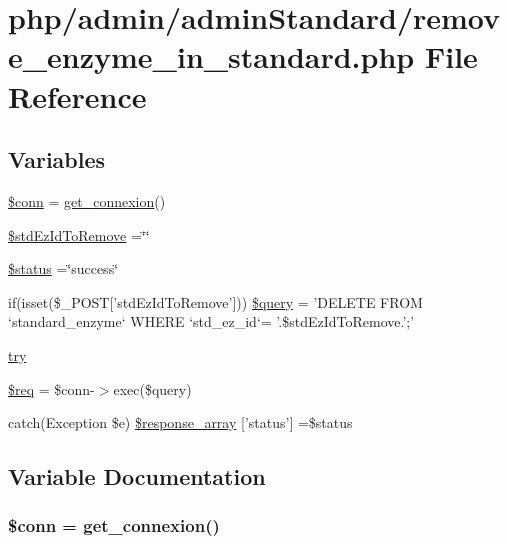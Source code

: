 \hypertarget{remove__enzyme__in__standard_8php}{\section{php/admin/admin\-Standard/remove\-\_\-enzyme\-\_\-in\-\_\-standard.php File Reference}
\label{remove__enzyme__in__standard_8php}
}
\subsection*{Variables}
\begin{DoxyCompactItemize}
\item 
\hyperlink{remove__enzyme__in__standard_8php_aa8a5a87b9c1a6a0819b88447cbe41877}{\$conn} = \hyperlink{php__functions_8php_ace18bc10f3fd08f92688ac743e0d8c2e}{get\-\_\-connexion}()
\item 
\hyperlink{remove__enzyme__in__standard_8php_a82f60c379683413d3b4269adbe259606}{\$std\-Ez\-Id\-To\-Remove} =\char`\"{}\char`\"{}
\item 
\hyperlink{remove__enzyme__in__standard_8php_a58391ea75f2d29d5d708d7050b641c33}{\$status} =\char`\"{}success\char`\"{}
\item 
if(isset(\$\-\_\-\-P\-O\-S\-T\mbox{[}'std\-Ez\-Id\-To\-Remove'\mbox{]})) \hyperlink{remove__enzyme__in__standard_8php_a46a28a65a24f7a31388b22d12d2bb16a}{\$query} = 'D\-E\-L\-E\-T\-E F\-R\-O\-M `standard\-\_\-enzyme` W\-H\-E\-R\-E `std\-\_\-ez\-\_\-id`= '.\$std\-Ez\-Id\-To\-Remove.';'
\item 
\hyperlink{remove__enzyme__in__standard_8php_abe4cc9788f52e49485473dc699537388}{try}
\item 
\hyperlink{remove__enzyme__in__standard_8php_a63a7a283ea5dee8af1e2d5a3435bf370}{\$req} = \$conn-\/$>$exec(\$query)
\item 
catch(Exception \$e) \hyperlink{remove__enzyme__in__standard_8php_a8452fb8131316637a04e25f5fde066d9}{\$response\-\_\-array} \mbox{[}'status'\mbox{]} =\$status
\end{DoxyCompactItemize}


\subsection{Variable Documentation}
\hypertarget{remove__enzyme__in__standard_8php_aa8a5a87b9c1a6a0819b88447cbe41877}{
\subsubsection[{\$conn}]{\setlength{\rightskip}{0pt plus 5cm}\$conn = {\bf get\-\_\-connexion}()}}\label{remove__enzyme__in__standard_8php_aa8a5a87b9c1a6a0819b88447cbe41877}


